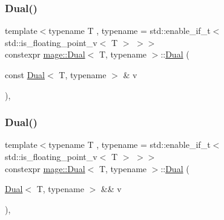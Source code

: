 \subsubsection{\texorpdfstring{Dual()}{Dual()}\hspace{0.1cm}{\footnotesize\ttfamily [3/5]}}
{\footnotesize\ttfamily template$<$typename T , typename  = std\+::enable\+\_\+if\+\_\+t$<$ std\+::is\+\_\+floating\+\_\+point\+\_\+v$<$ T $>$ $>$$>$ \\
constexpr \mbox{\hyperlink{structmage_1_1_dual}{mage\+::\+Dual}}$<$ T, typename $>$\+::\mbox{\hyperlink{structmage_1_1_dual}{Dual}} (\begin{DoxyParamCaption}\item[{const \mbox{\hyperlink{structmage_1_1_dual}{Dual}}$<$ T, typename $>$ \&}]{v }\end{DoxyParamCaption})\hspace{0.3cm}{\ttfamily [default]}, {\ttfamily [noexcept]}}

\mbox{\label{structmage_1_1_dual_a23c118e5db0959a97b71ee24ec984542}} 
\subsubsection{\texorpdfstring{Dual()}{Dual()}\hspace{0.1cm}{\footnotesize\ttfamily [4/5]}}
{\footnotesize\ttfamily template$<$typename T , typename  = std\+::enable\+\_\+if\+\_\+t$<$ std\+::is\+\_\+floating\+\_\+point\+\_\+v$<$ T $>$ $>$$>$ \\
constexpr \mbox{\hyperlink{structmage_1_1_dual}{mage\+::\+Dual}}$<$ T, typename $>$\+::\mbox{\hyperlink{structmage_1_1_dual}{Dual}} (\begin{DoxyParamCaption}\item[{\mbox{\hyperlink{structmage_1_1_dual}{Dual}}$<$ T, typename $>$ \&\&}]{v }\end{DoxyParamCaption})\hspace{0.3cm}{\ttfamily [default]}, {\ttfamily [noexcept]}}

\mbox{\label{structmage_1_1_dual_a2d8a99b9d65dd0dea90fbb071fa90864}} 
